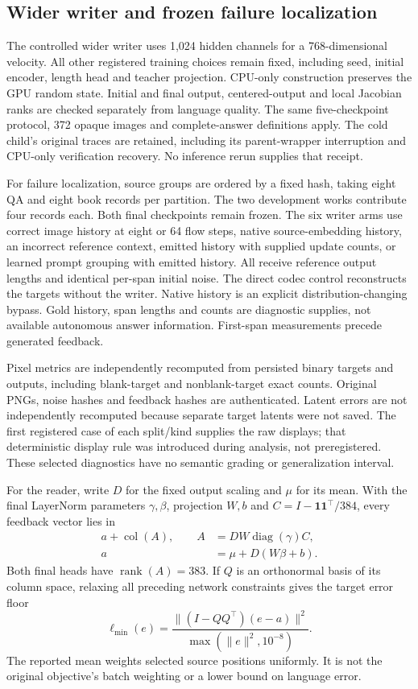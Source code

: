 \subsection*{Wider writer and frozen failure localization}
The controlled wider writer uses 1,024 hidden channels for a 768-dimensional
velocity. All other registered training choices remain fixed, including
seed, initial encoder, length head and teacher projection. CPU-only
construction preserves the GPU random state. Initial and final output,
centered-output and local Jacobian ranks are checked separately from
language quality. The same five-checkpoint protocol, 372 opaque images and
complete-answer definitions apply. The cold child's original traces are
retained, including its parent-wrapper interruption and CPU-only verification
recovery. No inference rerun supplies that receipt.

For failure localization, source groups are ordered by a fixed hash, taking
eight QA and eight book records per partition. The two development works
contribute four records each. Both final checkpoints remain frozen. The
six writer arms use correct image history at eight or 64 flow steps, native
source-embedding history, an incorrect reference context, emitted history
with supplied update counts, or learned prompt grouping with emitted
history. All receive reference output lengths and identical per-span initial
noise. The direct codec control reconstructs the targets without the writer.
Native history is an explicit distribution-changing bypass. Gold history,
span lengths and counts are diagnostic supplies, not available autonomous
answer information. First-span measurements precede generated feedback.

Pixel metrics are independently recomputed from persisted binary targets and
outputs, including blank-target and nonblank-target exact counts. Original
PNGs, noise hashes and feedback hashes are authenticated. Latent errors are
not independently recomputed because separate target latents were not saved.
The first registered case of each split/kind supplies the raw displays;
that deterministic display rule was introduced during analysis, not
preregistered. These selected diagnostics have no semantic grading or
generalization interval.

For the reader, write $D$ for the fixed output scaling and $\mu$ for its mean.
With the final LayerNorm parameters $\gamma,\beta$, projection $W,b$ and
$C=I-\mathbf1\mathbf1^\top/384$, every feedback vector lies in
\begin{align}
 a+\operatorname{col}(A),\qquad
 A&=DW\operatorname{diag}(\gamma)C,\\
 a&=\mu+D(W\beta+b).
\end{align}
Both final heads have $\operatorname{rank}(A)=383$. If $Q$ is an
orthonormal basis of its column space, relaxing all preceding network
constraints gives the target error floor
\begin{equation}
 \ell_{\min}(e)=
 \frac{\|(I-QQ^\top)(e-a)\|^2}{\max(\|e\|^2,10^{-8})}.
\end{equation}
The reported mean weights selected source positions uniformly. It is not
the original objective's batch weighting or a lower bound on language error.

